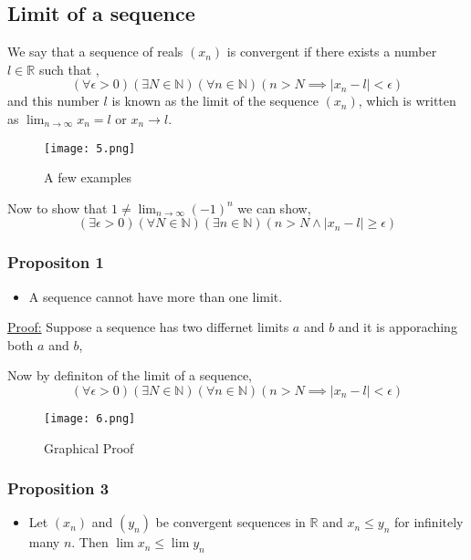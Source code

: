 \documentclass[12pt,a4paper]{article}
\begin{document}
\subsection{Limit of a sequence}
We say that a sequence of reals \((x_{n})\) is convergent if there exists a number \(l \in \mathbb{R} \) such that ,
\begin{equation*}
    (\forall \epsilon > 0 )(\exists N \in \mathbb{N})(\forall n \in \mathbb{N})(n > N \implies |x_{n} - l| < \epsilon)
\end{equation*}    
and this number \(l\) is known as the limit of the sequence \((x_{n})\), which is written as \(\lim_{n \to \infty} x_{n} =l \) or \(x_{n} \to l\).
\begin{figure}[ht]
    \centering
    \texttt{[image: 5.png]}
    \caption{A few examples}
\end{figure}

Now to show that \(1 \neq \lim_{n \to \infty }(-1)^n\) we can show,
\begin{equation*}
    (\exists \epsilon > 0)(\forall N \in \mathbb{N})(\exists n \in \mathbb{N})(n > N \wedge |x_{n} - l| \geq \epsilon)
\end{equation*}      

 \subsubsection*{Propositon 1} 
 \begin{itemize}
    \item A sequence cannot have more than one limit.       
 \end{itemize}
    \underline{Proof:} Suppose a sequence has two differnet limits \(a\) and \(b\) and it is apporaching both \(a\) and \(b\), 

    Now by definiton of the limit of a sequence,
    \begin{equation*}
        (\forall \epsilon > 0)(\exists N \in \mathbb{N})( \forall n \in \mathbb{N})(n > N \implies |x_{n} - l| < \epsilon)
    \end{equation*} 

 \begin{figure}[h]
    \centering
    \texttt{[image: 6.png]}
    \caption{Graphical Proof}
\end{figure}

 \subsubsection*{Proposition 3} 
 \begin{itemize}
    \item Let \(\left(x_n\right)\) and \(\left(y_n\right)\) be convergent sequences in \(\mathbb{R}\) and \(x_n \leq y_n\) for infinitely many \(n\). Then \(\lim x_n \leq \lim y_n\)  
 \end{itemize}
\end{document}
